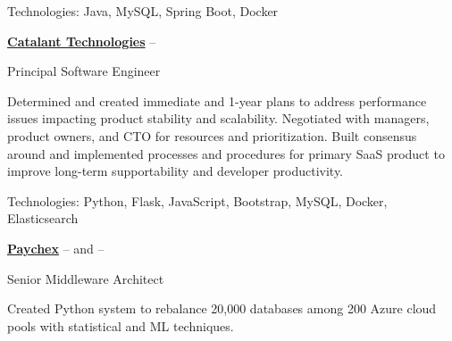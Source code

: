 \documentclass[letterpaper,MMMMyyyy,nonstopmode]{simpleresumecv}
\newif\ifLOCATION
\begin{document}
\begin{Body}
\begin{Detail}
\Gap
Technologies: Java, MySQL, Spring Boot, Docker

\end{Detail}

\BigGap

\Entry
\href{http://www.gocatalant.com}
{\textbf{Catalant Technologies}}
\hfill
 -- 

Principal Software Engineer
\ifLOCATION
\hfill
Rochester, New York
\fi

\begin{Detail}
\BulletItem
Determined and created immediate and 1-year plans to address performance issues impacting product stability and scalability.
Negotiated with managers, product owners, and CTO for resources and prioritization.
\BulletItem
Built consensus around and implemented processes and procedures for primary SaaS product to improve long-term supportability and developer productivity.

\Gap
Technologies: Python, Flask, JavaScript, Bootstrap, MySQL, Docker, Elasticsearch

\end{Detail}

\BigGap
\clearpage


\Entry
\href{http://www.paychex.com}
{\textbf{Paychex}}
\hfill
{} --  and  -- 

Senior Middleware Architect
\ifLOCATION
\hfill
Rochester, New York
\fi

\begin{Detail}
\iffalse
At Paychex I worked with multiple cross-functional teams to build: an inventory system to track hosts, JVMs, and databases; machine learning systems in Python to efficiently rebalance databases and predict system utilization; custom Chaos Monkey ro randomly terminate process to find configuration weaknesses; and implemented AppDynamics on over 20,000 JVMs.
\fi

\iftrue
\BulletItem
Created Python system to rebalance 20,000 databases among 200 Azure cloud pools with statistical and ML techniques.


\end{Detail}
\end{Body}
\end{document}

